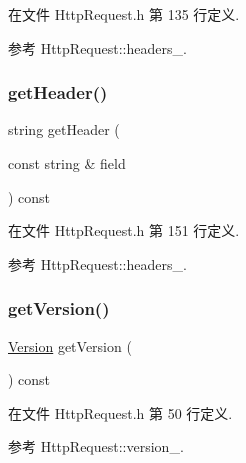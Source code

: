 在文件 Http\+Request.\+h 第 135 行定义.



参考 Http\+Request\+::headers\+\_\+.

\mbox{\label{classmuduo_1_1net_1_1HttpRequest_af5100c1c41231c455c4396cce9487b59}} 
\subsubsection{\texorpdfstring{get\+Header()}{getHeader()}}
{\footnotesize\ttfamily string get\+Header (\begin{DoxyParamCaption}\item[{const string \&}]{field }\end{DoxyParamCaption}) const\hspace{0.3cm}{\ttfamily [inline]}}



在文件 Http\+Request.\+h 第 151 行定义.



参考 Http\+Request\+::headers\+\_\+.

\mbox{\label{classmuduo_1_1net_1_1HttpRequest_ae75fb9d6c69d2fc12928d9a0b4489b61}} 
\subsubsection{\texorpdfstring{get\+Version()}{getVersion()}}
{\footnotesize\ttfamily \hyperlink{classmuduo_1_1net_1_1HttpRequest_a2256f5bba1c1c69a92b933aa501df470}{Version} get\+Version (\begin{DoxyParamCaption}{ }\end{DoxyParamCaption}) const\hspace{0.3cm}{\ttfamily [inline]}}



在文件 Http\+Request.\+h 第 50 行定义.



参考 Http\+Request\+::version\+\_\+.

